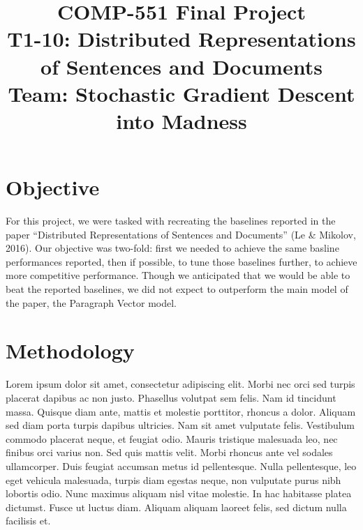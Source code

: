 \documentclass[conference]{IEEEtran}
\begin{document}
\title{COMP-551 Final Project\\
{\LARGE T1-10: Distributed Representations of Sentences and Documents}\\
{\Large Team: Stochastic Gradient Descent into Madness}
}

\author{
\and
{}
\and
{}
}

\maketitle

\section{Objective}

For this project, we were tasked with recreating the baselines reported in the paper ``Distributed Representations of Sentences and Documents'' (Le \& Mikolov, 2016). Our objective was two-fold: first we needed to achieve the same basline performances reported, then if possible, to tune those baselines further, to achieve more competitive performance. Though we anticipated that we would be able to beat the reported baselines, we did not expect to outperform the main model of the paper, the Paragraph Vector model.


\section{Methodology}

Lorem ipsum dolor sit amet, consectetur adipiscing elit. Morbi nec orci sed turpis placerat dapibus ac non justo. Phasellus volutpat sem felis. Nam id tincidunt massa. Quisque diam ante, mattis et molestie porttitor, rhoncus a dolor. Aliquam sed diam porta turpis dapibus ultricies. Nam sit amet vulputate felis. Vestibulum commodo placerat neque, et feugiat odio. Mauris tristique malesuada leo, nec finibus orci varius non. Sed quis mattis velit. Morbi rhoncus ante vel sodales ullamcorper. Duis feugiat accumsan metus id pellentesque. Nulla pellentesque, leo eget vehicula malesuada, turpis diam egestas neque, non vulputate purus nibh lobortis odio. Nunc maximus aliquam nisl vitae molestie. In hac habitasse platea dictumst. Fusce ut luctus diam. Aliquam aliquam laoreet felis, sed dictum nulla facilisis et.
\end{document}
